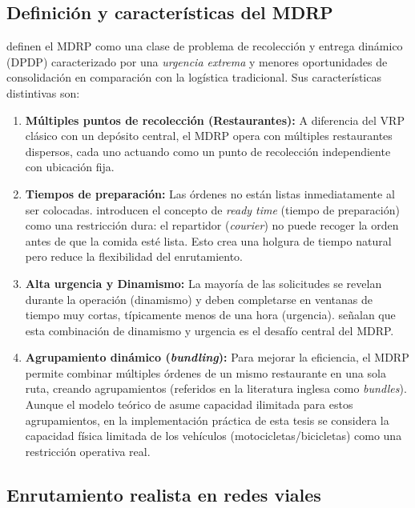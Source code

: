 \documentclass[12pt,letterpaper,oneside]{book}
\begin{document}
\subsection{Definición y características del MDRP}

\citet{Reyes2018} definen el MDRP como una clase de problema de recolección y entrega dinámico (DPDP) caracterizado por una
\textit{urgencia extrema} y menores oportunidades de consolidación en comparación con la logística tradicional. Sus características
distintivas son:

\begin{enumerate}
	\item \textbf{Múltiples puntos de recolección (Restaurantes):} A diferencia del VRP clásico con un depósito central, el 
	MDRP opera con múltiples restaurantes dispersos, cada uno actuando como un punto de recolección independiente con ubicación
	fija.
	
	\item \textbf{Tiempos de preparación:} Las órdenes no están listas inmediatamente al ser colocadas. 
	\citet{Reyes2018} introducen el concepto de \textit{ready time} (tiempo de preparación) como una restricción dura: el repartidor (\textit{courier}) no puede
	recoger la orden antes de que la comida esté lista. Esto crea una holgura de tiempo natural pero reduce la flexibilidad del enrutamiento.
	
	\item \textbf{Alta urgencia y Dinamismo:} La mayoría de las solicitudes se revelan durante la operación (dinamismo)
	y deben completarse en ventanas de tiempo muy cortas, típicamente menos de una hora (urgencia). \citet{Reyes2018}
	señalan que esta combinación de dinamismo y urgencia es el desafío central del MDRP.
	
	\item \textbf{Agrupamiento dinámico (\textit{bundling}):} Para mejorar la eficiencia, el MDRP permite combinar múltiples órdenes de un 
	mismo restaurante en una sola ruta, creando agrupamientos (referidos en la literatura inglesa como \textit{bundles}). Aunque el modelo teórico de \citet{Reyes2018} asume capacidad
	ilimitada para estos agrupamientos, en la implementación práctica de esta tesis se considera la capacidad física limitada 
	de los vehículos (motocicletas/bicicletas) como una restricción operativa real.
\end{enumerate}



\subsection{Enrutamiento realista en redes viales} 
\end{document}
